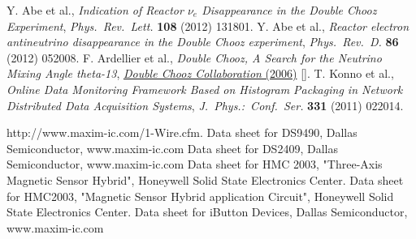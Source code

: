 \documentclass{JINST}
\begin{document}
\begin{thebibliography}{9}

Y. Abe et al., \emph{Indication of Reactor $\nu_{e}$ Disappearance in the Double Chooz Experiment}, {\emph{Phys.\ Rev.\ Lett.} {\bf 108} (2012) 131801}.
Y. Abe et al., \emph{Reactor electron antineutrino disappearance in the Double Chooz experiment}, {\emph{Phys.\ Rev.\ D.} {\bf 86} (2012) 052008}.
F. Ardellier et al., \emph{Double Chooz, A Search for the Neutrino Mixing Angle theta-13},
\href{http://arxiv.org/abs/hep-ex/0606025}
{\emph{Double Chooz Collaboration} (2006)}
[].
T. Konno et al., \emph{Online Data Monitoring Framework Based on Histogram Packaging in Network Distributed Data Acquisition Systems}, {\emph{J.\ Phys.:\ Conf.\ Ser.} {\bf 331} (2011) 022014}.

http://www.maxim-ic.com/1-Wire.cfm.
Data sheet for DS9490, Dallas Semiconductor, www.maxim-ic.com
Data sheet for DS2409, Dallas Semiconductor, www.maxim-ic.com
Data sheet for HMC 2003, "Three-Axis Magnetic Sensor Hybrid", Honeywell Solid State Electronics Center.
Data sheet for HMC2003, "Magnetic Sensor Hybrid application Circuit", Honeywell Solid State Electronics Center.
Data sheet for iButton Devices, Dallas Semiconductor, www.maxim-ic.com
\end{thebibliography}
\end{document}
